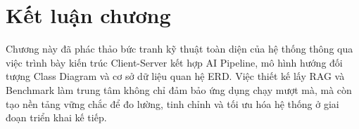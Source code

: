 \section{Kết luận chương}

Chương này đã phác thảo bức tranh kỹ thuật toàn diện của hệ thống thông qua việc trình bày kiến trúc Client-Server kết hợp AI Pipeline, mô hình hướng đối tượng Class Diagram và cơ sở dữ liệu quan hệ ERD. Việc thiết kế lấy RAG và Benchmark làm trung tâm không chỉ đảm bảo ứng dụng chạy mượt mà, mà còn tạo nền tảng vững chắc để đo lường, tinh chỉnh và tối ưu hóa hệ thống ở giai đoạn triển khai kế tiếp.